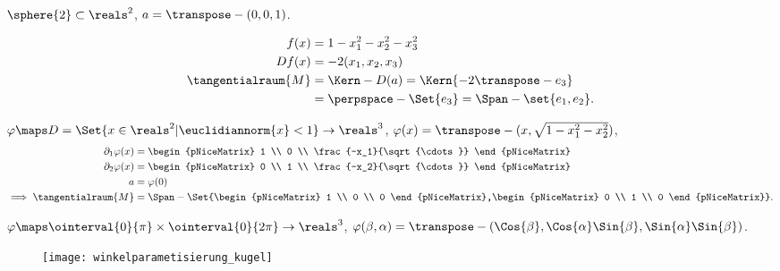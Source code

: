 \begin{beispiel*}
  \( \sphere{2}\subset \reals^2 \), \( a=\transpose-{(0,0,1)} \).
  \begin{eigenschaftenenumerate}
    \item
    \begin{align*}
      f(x)&=1-x_1^2-x_2^2-x_3^2\\
      Df(x)&=-2(x_1,x_2,x_3)\\
      \tangentialraum{M}&=\Kern-{D(a)}=\Kern{-2\transpose-{e_3}}\\
      &=\perpspace-{\Set{e_3}}=\Span-{\set{e_1,e_2}}.
    \end{align*}
    \item \( \varphi\maps D=\Set{x\in \reals^2|\euclidiannorm{x}<1} \to \reals^3\), \( \varphi(x)=\transpose-{(x,\sqrt{1-x_1^2-x_2^2})} \),
    \begin{align*}
      \partial_1 \varphi(x)&=\begin{pNiceMatrix} 1 \\ 0 \\ \frac{-x_1}{\sqrt{\cdots}} \end{pNiceMatrix}\\
      \partial_2 \varphi(x)&=\begin{pNiceMatrix} 0 \\ 1 \\ \frac{-x_2}{\sqrt{\cdots}} \end{pNiceMatrix}\\
      a&= \varphi(0)\\
      \implies \tangentialraum{M}&=\Span-{\Set{\begin{pNiceMatrix} 1 \\ 0 \\ 0 \end{pNiceMatrix},\begin{pNiceMatrix} 0 \\ 1 \\ 0 \end{pNiceMatrix}}}.
    \end{align*}
    \item \( \varphi\maps \ointerval{0}{\pi}\times\ointerval{0}{2\pi} \to \reals^3\), \( \varphi(\beta,\alpha)=\transpose-{(\Cos{\beta},\Cos{\alpha}\Sin{\beta},\Sin{\alpha}\Sin{\beta})} \). 
    \begin{figure}[H]
      \centering
      \texttt{[image: winkelparametisierung\_kugel]}
      \label{fig:winkelparametisierung_kugel}
    \end{figure}

\end{eigenschaftenenumerate}
\end{beispiel*}
